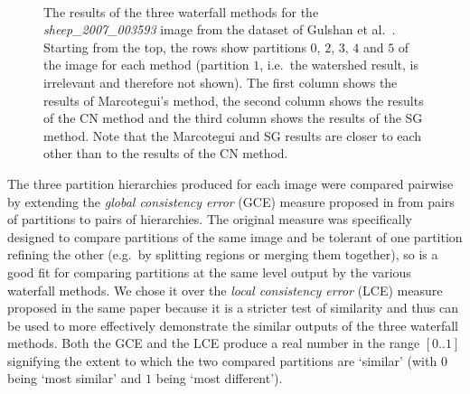 \documentclass[preprint,a4paper]{elsarticle}
\newenvironment{stusubfig}[1]
{
	\begin{figure}[#1]
	\begin{center}
}
{
	\end{center}
	\end{figure}
}
\begin{document}
\begin{stusubfig}{!t}
	\\
	\hspace{4mm}%
	\hspace{4mm}%
\caption{The results of the three waterfall methods for the \emph{sheep\_2007\_003593} image from the dataset of Gulshan et al.\ \cite{gulshan10}. Starting from the top, the rows show partitions $0$, $2$, $3$, $4$ and $5$ of the image for each method (partition $1$, i.e.~the watershed result, is irrelevant and therefore not shown). The first column shows the results of Marcotegui's method, the second column shows the results of the CN method and the third column shows the results of the SG method. Note that the Marcotegui and SG results are closer to each other than to the results of the CN method.}
\label{fig:sheep}
\end{stusubfig}

The three partition hierarchies produced for each image were compared pairwise by extending the \emph{global consistency error} (GCE) measure proposed in \cite{martin01} from pairs of partitions to pairs of hierarchies. The original measure was specifically designed to compare partitions of the same image and be tolerant of one partition refining the other (e.g.~by splitting regions or merging them together), so is a good fit for comparing partitions at the same level output by the various waterfall methods. We chose it over the \emph{local consistency error} (LCE) measure proposed in the same paper because it is a stricter test of similarity and thus can be used to more effectively demonstrate the similar outputs of the three waterfall methods. Both the GCE and the LCE produce a real number in the range $[0..1]$ signifying the extent to which the two compared partitions are `similar' (with $0$ being `most similar' and $1$ being `most different').
\end{document}
